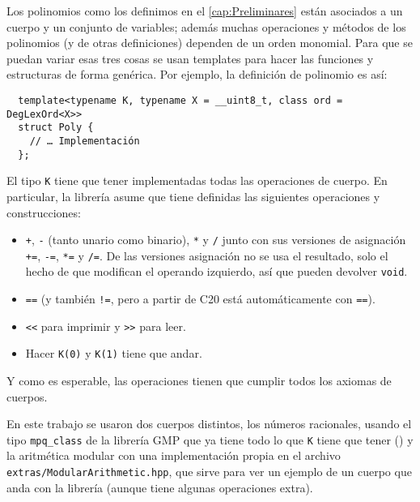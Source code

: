 \documentclass[12pt]{report}
\theoremstyle{customstyle}
\theoremstyle{factstyle}
\newcommand\cppXX{C\nolinebreak[4]\hspace{-.05em}\raisebox{.4ex}{\relsize{-3}{\textbf{++}}}20\xspace}
\begin{document}
Los polinomios como los definimos en el \cref{cap:Preliminares} están asociados a un cuerpo y un conjunto de variables; además muchas operaciones y métodos de los polinomios (y de otras definiciones) dependen de un orden monomial. Para que se puedan variar esas tres cosas se usan templates para hacer las funciones y estructuras de forma genérica. Por ejemplo, la definición de polinomio es así: %

\begin{verbatim}
  template<typename K, typename X = __uint8_t, class ord = DegLexOrd<X>>
  struct Poly {
    // … Implementación
  };
\end{verbatim}

El tipo \texttt{K} tiene que tener implementadas todas las operaciones de cuerpo. En particular, la librería asume que tiene definidas las siguientes operaciones y construcciones:

\begin{itemize}
  \item \texttt{+}, \texttt{-} (tanto unario como binario), \texttt{*} y \texttt{/} junto con sus versiones de asignación \texttt{+=}, \texttt{-=}, \texttt{*=} y \texttt{/=}. De las versiones asignación no se usa el resultado, solo el hecho de que modifican el operando izquierdo, así que pueden devolver \texttt{void}.
  \item \texttt{==} (y también \texttt{!=}, pero a partir de \cppXX está automáticamente con \texttt{==}).
  \item \texttt{<<} para imprimir y \texttt{>>} para leer.
  \item Hacer \texttt{K(0)} y \texttt{K(1)} tiene que andar.
\end{itemize}

Y como es esperable, las operaciones tienen que cumplir todos los axiomas de cuerpos.

En este trabajo se usaron dos cuerpos distintos, los números racionales, usando el tipo \texttt{mpq\_class} de la librería GMP que ya tiene todo lo que \texttt{K} tiene que tener (\cite{lib:gmp}) y la aritmética modular con una implementación propia en el archivo \texttt{extras/ModularArithmetic.hpp}, que sirve para ver un ejemplo de un cuerpo que anda con la librería (aunque tiene algunas operaciones extra).
\end{document}
